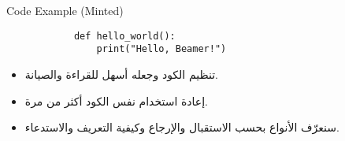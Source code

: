 \documentclass{beamer}
\begin{document}
    \begin{frame}[fragile]{Code Example (Minted)}
        \begin{verbatim}
            def hello_world():
                print("Hello, Beamer!")
        \end{verbatim}
    \end{frame}

    \begin{frame}
    \begin{itemize}[<+->]
  \item تنظيم الكود وجعله أسهل للقراءة والصيانة.
  \item إعادة استخدام نفس الكود أكثر من مرة.
  \item سنعرّف الأنواع بحسب الاستقبال والإرجاع وكيفية التعريف والاستدعاء.
\end{itemize}
\end{frame}

    
\end{document}
